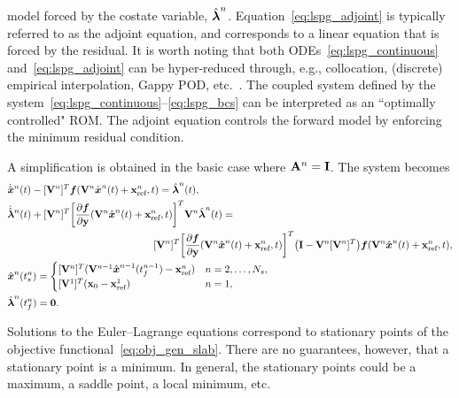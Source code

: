model forced by the costate variable, $\hat{\boldsymbol \lambda}^{n}$.
Equation~\eqref{eq:lspg_adjoint} is typically referred to as the adjoint
equation, and corresponds to a linear equation that is forced by the residual.
It is worth noting that both ODEs~\eqref{eq:lspg_continuous}
and~\eqref{eq:lspg_adjoint} can be hyper-reduced through, e.g.,
collocation, (discrete) empirical interpolation, Gappy POD, etc.~\cite{everson_sirovich_gappy,eim,qdeim_drmac}. The
coupled system defined by the system~\eqref{eq:lspg_continuous}--\eqref{eq:lspg_bcs} can be interpreted as an ``optimally controlled"
ROM. The adjoint equation controls the forward model by enforcing the minimum
residual condition.

A simplification is obtained in the basic case %
where $\mathbf{A}^{n} = \mathbf{I}$.
The system becomes
\begin{align*}\label{eq:lspg_continuous_simle} & \genstateDotArg{n}{t}  -
\basisspaceTArg{n}  \velocity(\veloargsromn) =  \adjointArg{n}{t} , \\
 &\adjointDotArg{n}{t}   + \basisspaceTArg{n} \bigg[\frac{\partial
\velocity}{\partial \stateyDiscrete}(\veloargsromn)\bigg]^T \basisspaceArg{n} \adjointArg{n}{t} = \\
&\hspace{2 in} \basisspaceTArg{n} \bigg[
\frac{\partial \velocity}{\partial \stateyDiscrete} (\veloargsromn) \bigg]^T \big( \mathbf{I} -   \basisspaceArg{n} \basisspaceTArg{n}
\big)    \velocity(\veloargsromn) , \\ & \genstateArg{n}{\timeStartArg{n}} =
\begin{cases} \basisspaceTArg{n}(\basisspaceArg{n-1}\genstateArg{n-1}{\timeEndArg{n-1}} - \stateInterceptArg{n})& n=2,\ldots,\nslabs, \\
\genstateICOne& n=1, \end{cases}\\
&\adjointArg{n}{\timeEndArg{n}} = \boldsymbol 0 .  \end{align*}
\begin{remark}
Solutions to the Euler--Lagrange equations correspond to stationary points 
of the objective functional~\eqref{eq:obj_gen_slab}. There are no guarantees, 
however, that a stationary point is a minimum. In general, the stationary 
points could be a maximum, a saddle point, a local minimum, etc.
\end{remark}

